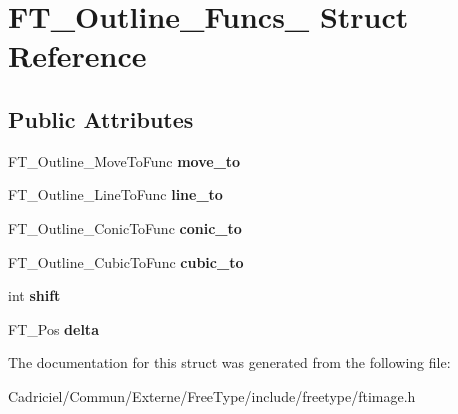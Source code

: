 \hypertarget{struct_f_t___outline___funcs__}{\section{F\-T\-\_\-\-Outline\-\_\-\-Funcs\-\_\- Struct Reference}
\label{struct_f_t___outline___funcs__}
}
\subsection*{Public Attributes}
\begin{DoxyCompactItemize}
\item 
\hypertarget{struct_f_t___outline___funcs___abd53463a59a1ae2c6998e619c2ab6a65}{F\-T\-\_\-\-Outline\-\_\-\-Move\-To\-Func {\bfseries move\-\_\-to}}\label{struct_f_t___outline___funcs___abd53463a59a1ae2c6998e619c2ab6a65}

\item 
\hypertarget{struct_f_t___outline___funcs___a876fc8ca7541786cd3c4ec3806f88360}{F\-T\-\_\-\-Outline\-\_\-\-Line\-To\-Func {\bfseries line\-\_\-to}}\label{struct_f_t___outline___funcs___a876fc8ca7541786cd3c4ec3806f88360}

\item 
\hypertarget{struct_f_t___outline___funcs___a09681f5a64189066d3fba3cf398a135b}{F\-T\-\_\-\-Outline\-\_\-\-Conic\-To\-Func {\bfseries conic\-\_\-to}}\label{struct_f_t___outline___funcs___a09681f5a64189066d3fba3cf398a135b}

\item 
\hypertarget{struct_f_t___outline___funcs___aa3e0c1bacb181a5f43c104ab7f72cfda}{F\-T\-\_\-\-Outline\-\_\-\-Cubic\-To\-Func {\bfseries cubic\-\_\-to}}\label{struct_f_t___outline___funcs___aa3e0c1bacb181a5f43c104ab7f72cfda}

\item 
\hypertarget{struct_f_t___outline___funcs___a540c246669b21b86cb405b3d9019cfda}{int {\bfseries shift}}\label{struct_f_t___outline___funcs___a540c246669b21b86cb405b3d9019cfda}

\item 
\hypertarget{struct_f_t___outline___funcs___a3c3121398b3ff564b4f3fd5b2a318e5e}{F\-T\-\_\-\-Pos {\bfseries delta}}\label{struct_f_t___outline___funcs___a3c3121398b3ff564b4f3fd5b2a318e5e}

\end{DoxyCompactItemize}


The documentation for this struct was generated from the following file\-:\begin{DoxyCompactItemize}
\item 
Cadriciel/\-Commun/\-Externe/\-Free\-Type/include/freetype/ftimage.\-h\end{DoxyCompactItemize}
